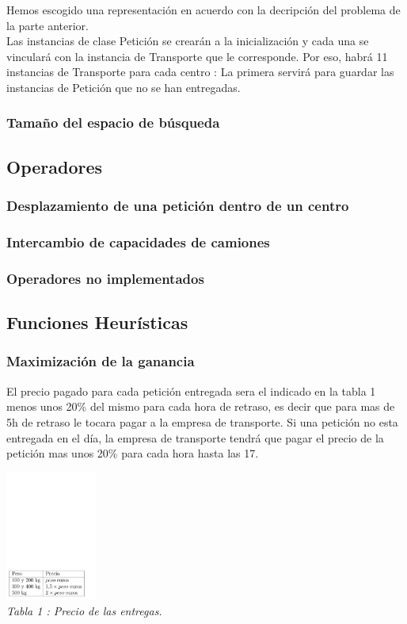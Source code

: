 \documentclass{article}
\begin{document}
Hemos escogido una representación en acuerdo con la decripción del problema de
la parte anterior.\\
Las instancias de clase Petición se crearán a la inicialización y cada una se
vinculará con la instancia de Transporte que le corresponde. Por eso, habrá 11
instancias de Transporte para cada centro : La primera servirá para guardar las
instancias de Petición que no se han entregadas.
\subsubsection{Tamaño del espacio de búsqueda}


\subsection{Operadores}
\subsubsection{Desplazamiento de una petición dentro de un centro}
\subsubsection{Intercambio de capacidades de camiones}
\subsubsection{Operadores no implementados}


\subsection{Funciones Heurísticas}
\subsubsection{Maximización de la ganancia}

El precio pagado para cada petición entregada sera el indicado en la tabla 1
menos unos 20\% del mismo para cada hora de retraso, es decir que para mas de 5h
de retraso le tocara pagar a la empresa de transporte. Si una petición no esta
entregada en el día, la empresa de transporte tendrá que pagar el precio de la
petición mas unos 20\% para cada hora hasta las 17.
\begin{center}
\includegraphics[width=3cm]{preciosEntregas}\\
{\it Tabla 1 : Precio de las entregas.} \end{center}
\end{document}
